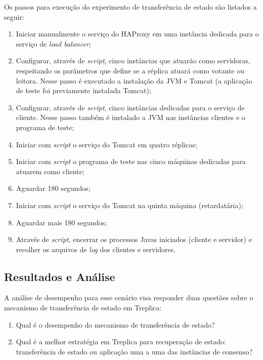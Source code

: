 Os passos para execução do experimento de transferência de estado são listados a seguir:

\begin{enumerate}
  \item Iniciar manualmente o serviço do HAProxy em uma instância dedicada para o serviço
    de \emph{load balancer};
  \item Configurar, através de \emph{script}, cinco instâncias que atuarão como
    servidoras, respeitando os parâmetros que define se a réplica atuará como votante ou
    leitora. Nesse passo é executado a instalação da JVM e Tomcat (a aplicação de teste
    foi previamente instalada Tomcat);
  \item Configurar, através de \emph{script}, cinco instâncias dedicadas para o serviço de
    cliente. Nesse passo também é instalado a JVM nas instâncias clientes e o programa de
    teste;
  \item Iniciar com \emph{script} o serviço do Tomcat em quatro réplicas;
  \item Iniciar com \emph{script} o programa de teste nas cinco máquinas dedicadas para
    atuarem como cliente;
  \item Aguardar 180 segundos;
  \item Iniciar com \emph{script} o serviço do Tomcat na quinta máquina (retardatária);
  \item Aguardar mais 180 segundos;
  \item Através de \emph{script}, encerrar os processos Javas iniciados (cliente e
    servidor) e recolher os arquivos de \emph{log} dos clientes e servidores.
\end{enumerate}

\subsection{Resultados e Análise}

A análise de desempenho para esse cenário visa responder duas questões sobre o mecanismo
de transferência de estado em Treplica:

\begin{enumerate}
  \item Qual é o desempenho do mecanismo de transferência de estado?
  \item Qual é a melhor estratégia em Treplica para recuperação de estado: transferência de
    estado ou aplicação uma a uma das instâncias de consenso?
\end{enumerate}

